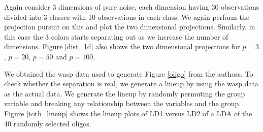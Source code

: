 \documentclass[12]{report}
\begin{document}

Again consider 3 dimensions of pure noise, each dimension having 30 observations divided into 3 classes with 10 observations in each class. We again perform the projection pursuit on this and plot the two dimensional projections. Similarly, in this case the 3 colors starts separating out as we increase the number of dimensions.  Figure \ref{dist_1d} also shows the two dimensional projections for $p=3$, $p=20$, $p=50$ and $p=100$.






We obtained the wasp data used to generate Figure \ref{oligo} from the authors. To check whether the separation is real, we generate a lineup by using the wasp data as the actual data. We generate the lineup by randomly permuting the group variable and breaking any relationship between the variables  and the group. Figure \ref{toth_lineup} shows the lineup plots of LD1 versus LD2 of a LDA of the 40 randomly selected oligos.
\end{document}
